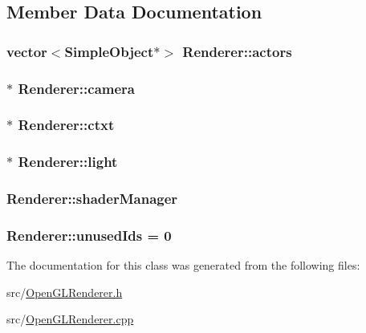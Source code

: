 \subsection{Member Data Documentation}
\hypertarget{class_renderer_a0720c526eb9be11876d4849af801eb91}{
\subsubsection[{actors}]{\setlength{\rightskip}{0pt plus 5cm}vector$<${\bf Simple\-Object}$\ast$$>$ Renderer\-::actors}}\label{class_renderer_a0720c526eb9be11876d4849af801eb91}
\hypertarget{class_renderer_af7ed774ad36cde6ec727ccc0bd5d0b6f}{
\subsubsection[{camera}]{$\ast$ Renderer\-::camera}}\label{class_renderer_af7ed774ad36cde6ec727ccc0bd5d0b6f}
\hypertarget{class_renderer_aea515600e7513ae80843e009e5148f53}{
\subsubsection[{ctxt}]{$\ast$ Renderer\-::ctxt}}\label{class_renderer_aea515600e7513ae80843e009e5148f53}
\hypertarget{class_renderer_adade11a742565582736c8058041803e5}{
\subsubsection[{light}]{$\ast$ Renderer\-::light}}\label{class_renderer_adade11a742565582736c8058041803e5}
\hypertarget{class_renderer_a8cde2a34816fc71455871bc0e3b18853}{
\subsubsection[{shader\-Manager}]{ Renderer\-::shader\-Manager}}\label{class_renderer_a8cde2a34816fc71455871bc0e3b18853}
\hypertarget{class_renderer_a4182a30e4246da1112f631b3d850ac14}{
\subsubsection[{unused\-Ids}]{ Renderer\-::unused\-Ids = 0\hspace{0.3cm}{\ttfamily [static]}}}\label{class_renderer_a4182a30e4246da1112f631b3d850ac14}


The documentation for this class was generated from the following files\-:\begin{DoxyCompactItemize}
\item 
src/\hyperlink{_open_g_l_renderer_8h}{Open\-G\-L\-Renderer.\-h}\item 
src/\hyperlink{_open_g_l_renderer_8cpp}{Open\-G\-L\-Renderer.\-cpp}\end{DoxyCompactItemize}
